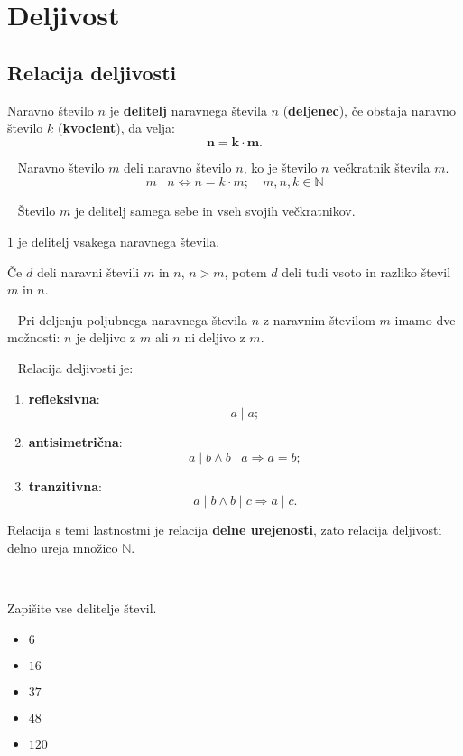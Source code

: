 \chapter{Deljivost}


    \section{Relacija deljivosti}
            
        Naravno število $n$ je \textbf{delitelj} naravnega števila $n$ (\textbf{deljenec}), če obstaja naravno število $k$ (\textbf{kvocient}), da velja: $$\mathbf{n=k\cdot m}.$$
    
        ~\newline
        Naravno število $m$ deli naravno število $n$, ko je število $n$ večkratnik števila $m$. $$m\mid n \Leftrightarrow n=k\cdot m;\quad m,n,k\in\mathbb{N}$$
    
        ~\newline
        Število $m$ je delitelj samega sebe in vseh svojih večkratnikov.
    
        $1$ je delitelj vsakega naravnega števila.
        ~\newline

        Če $d$ deli naravni števili $m$ in $n$, $n>m$, potem $d$ deli tudi vsoto in razliko števil $m$ in $n$.
    
        ~\newline
        Pri deljenju poljubnega naravnega števila $n$ z naravnim številom $m$ imamo dve možnosti: $n$ je deljivo z $m$ ali $n$ ni deljivo z $m$.

        ~\newline
        Relacija deljivosti je:
        \begin{enumerate}
            \item \textbf{refleksivna}: $$a\mid a;$$
            \item \textbf{antisimetrična}: $$a\mid b \wedge b\mid a \Rightarrow a=b;$$
            \item \textbf{tranzitivna}:  $$a\mid b \wedge b\mid c \Rightarrow a\mid c.$$
        \end{enumerate}
    
        Relacija s temi lastnostmi je relacija \textbf{delne urejenosti}, zato relacija deljivosti delno ureja množico $\mathbb{N}$.
    
        ~\newline~
    
        \begin{naloga}
            Zapišite vse delitelje števil.
            \begin{itemize}
                \item $6$ 
                \item $16$ 
                \item $37$ 
                \item $48$ 
                \item $120$ 
            \end{itemize}
        \end{naloga}        

